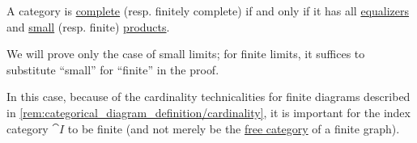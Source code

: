 \begin{proposition}\label{thm:category_completeness_via_products_and_equalizers}
  A category is \hyperref[def:complete_category]{complete} (resp. finitely complete) if and only if it has all \hyperref[def:categorical_equalizer]{equalizers} and \hyperref[def:categorical_diagram/small]{small} (resp. finite) \hyperref[def:categorical_product]{products}.
\end{proposition}
\begin{comments}
  \item We will prove only the case of small limits; for finite limits, it suffices to substitute \enquote{small} for \enquote{finite} in the proof.

  In this case, because of the cardinality technicalities for finite diagrams described in \cref{rem:categorical_diagram_definition/cardinality}, it is important for the index category \( \cat{I} \) to be finite (and not merely be the \hyperref[def:free_category]{free category} of a finite graph).
\end{comments}
